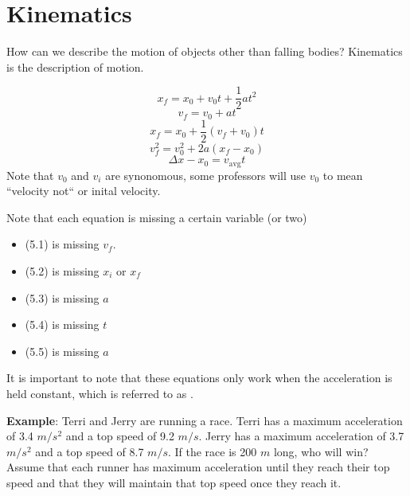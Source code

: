 \chapter{Kinematics}

How can we describe the motion of objects other than falling bodies? Kinematics 
is the description of motion. 



\begin{mdframed}[frametitle = {Kinematic Equations}, style=important]
\begin{equation} %
    x_f = x_0 + v_0 t + \frac{1}{2}at^2
\end{equation}
\begin{equation} %
    v_f = v_0 + at
\end{equation}
\begin{equation} %
    x_f = x_0 + \frac{1}{2}\left(v_f + v_0 \right)t
\end{equation}
\begin{equation} %
    v_f^2 = v_0^2 + 2a\left(x_f - x_0 \right)
\end{equation}
\begin{equation} %
    \Delta x - x_0 = v_{\text{avg}}t
\end{equation}
Note that $v_0$ and $v_i$ are synonomous, some professors will use $v_0$ to mean ``velocity not`` or inital velocity.
\end{mdframed}

Note that each equation is missing a certain variable (or two)
\begin{itemize}
    \item (5.1) is missing $v_f$. 
    \item (5.2) is missing $x_i$ or $x_f$
    \item (5.3) is missing $a$
    \item (5.4) is missing $t$
    \item (5.5) is missing $a$
\end{itemize} 

It is important to note that these equations only work when the acceleration is held constant, which is referred to as . 

\textbf{Example}: Terri and Jerry are running a race. Terri has a maximum 
acceleration of 3.4 $m/s^2$ and a top speed of 9.2 $m/s$. Jerry has a maximum 
acceleration of 3.7 $m/s^2$ and a top speed of 8.7 $m/s$. If the race is 200 $m$ 
long, who will win? Assume that each runner has maximum acceleration until they 
reach their top speed and that they will maintain that top speed once they reach 
it. 

